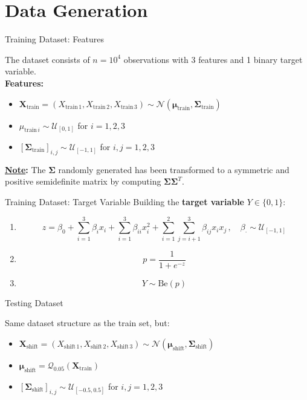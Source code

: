 \section{Data Generation}

\begin{frame}{Training Dataset: Features}

    The dataset consists of $n = 10^4$ observations with 3 features and 1 binary target variable.\\\vspace{0.3cm}
    \pause\textbf{Features:}
    \begin{itemize}
        \item $ \boldsymbol{X}_{\text{train}} = (X_{\text{train}\,1}, X_{\text{train}\,2}, X_{\text{train}\,3}) \sim \mathcal{N}(\boldsymbol{\mu}_{\text{train}}, \boldsymbol{\Sigma}_{\text{train}}) $
        \item $ \mu_{\text{train}\,i} \sim \mathcal{U}_{[0,1]} $ for $ i = 1, 2, 3 $
        \item $ [\boldsymbol{\Sigma}_{\text{train}}]_{i,j} \sim \mathcal{U}_{[-1,1]} $ for $ i, j = 1, 2, 3 $
    \end{itemize}
    \vspace{0.3cm}
    \textbf{\underline{Note}:} The $\boldsymbol{\Sigma}$ randomly generated has been transformed to a symmetric and positive semidefinite matrix by computing $\boldsymbol{\Sigma}\boldsymbol{\Sigma}^T$. 

\end{frame}

\begin{frame}{Training Dataset: Target Variable}
    Building the \textbf{target variable} $Y\in\{0,1\}$:

    \begin{enumerate}
        \item $$ 
        z = \beta_0 + \sum_{i=1}^3 \beta_i x_i + \sum_{i=1}^3 \beta_{ii} x_i^2 + \sum_{i=1}^{2} \sum_{j=i+1}^3 \beta_{ij} x_i x_j\,,   \quad \beta_{\cdot} \sim \mathcal{U}_{[-1,1]}
        $$
        \item $$ p = \frac{1}{1 + e^{-z}}$$
        \item $$ Y \sim \text{Be}(p)$$
    \end{enumerate}
\end{frame}

\begin{frame}{Testing Dataset}

    Same dataset structure as the train set, but:
    \begin{itemize}
        \item $ \boldsymbol{X}_{\text{shift}} = (X_{\text{shift}\,1}, X_{\text{shift}\,2}, X_{\text{shift}\,3}) \sim \mathcal{N}(\boldsymbol{\mu}_{\text{shift}}, \boldsymbol{\Sigma}_{\text{shift}}) $
        \item $ \boldsymbol{\mu}_{\text{shift}} = \mathcal{Q}_{0.05}(\boldsymbol{X}_{\text{train}})$
        \item $ [\boldsymbol{\Sigma}_{\text{shift}}]_{i,j} \sim \mathcal{U}_{[-0.5,0.5]} $ for $ i, j = 1, 2, 3 $
    \end{itemize}
    
\end{frame}

